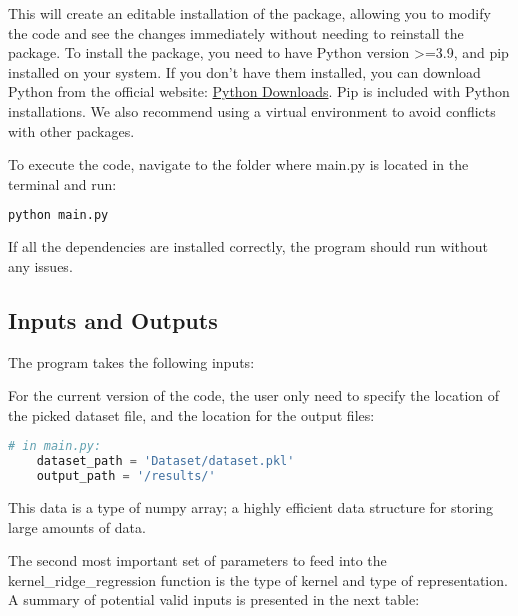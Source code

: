 \documentclass{article}
\begin{document}
This will create an editable installation of the package, allowing you to modify the code and see the changes immediately without needing to reinstall the package.
To install the package, you need to have Python  version >=3.9, and pip installed on your system. If you don't have them installed, you can download Python from the official website: \href{https://www.python.org/downloads/}{Python Downloads}. Pip is included with Python installations.
We also recommend using a virtual environment to avoid conflicts with other packages. 

To execute the code, navigate to the folder where main.py is located in the terminal and run:
\begin{lstlisting}[language=bash]
    python main.py
\end{lstlisting}

If all the dependencies are installed correctly, the program should run without any issues.

\subsection{Inputs and Outputs}

The program takes the following inputs:

For the current version of the code, the user only need to specify the location of the picked dataset file, and the location for the output files: 
\begin{lstlisting}[language=python]
    # in main.py:
    dataset_path = 'Dataset/dataset.pkl'
    output_path = '/results/'
\end{lstlisting}

This data is a type of numpy array; a highly efficient data structure for storing large amounts of data.

The second most important set of parameters to feed into the kernel\_ridge\_regression function is the type of kernel and 
type of representation. A summary of potential valid inputs is presented in the next table:
\end{document}
